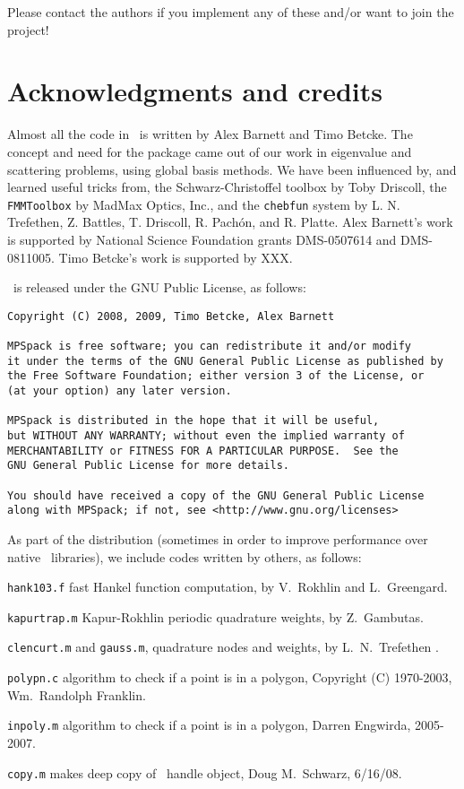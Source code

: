\documentclass[12pt]{article}
\begin{document}
Please contact the authors if you implement any of these and/or want
to join the project!



\section{Acknowledgments and credits}

Almost all the code in \mpspack\ is written by 
Alex Barnett and Timo Betcke.
The concept and need for the package came out of our work in eigenvalue
and scattering problems, using global basis methods.
We have been influenced by, and learned useful tricks from,
the Schwarz-Christoffel toolbox by Toby Driscoll,
the {\tt FMMToolbox} by MadMax Optics, Inc.,
and the {\tt chebfun} system
by L. N. Trefethen, Z. Battles, T. Driscoll, R. Pach\'{o}n, and R. Platte.
Alex Barnett's work is supported by National Science Foundation
grants DMS-0507614 and DMS-0811005.
Timo Betcke's work is supported by XXX.

\mpspack\ is released under the GNU Public License, as follows:
\begin{verbatim}
Copyright (C) 2008, 2009, Timo Betcke, Alex Barnett

MPSpack is free software; you can redistribute it and/or modify
it under the terms of the GNU General Public License as published by
the Free Software Foundation; either version 3 of the License, or
(at your option) any later version.

MPSpack is distributed in the hope that it will be useful,
but WITHOUT ANY WARRANTY; without even the implied warranty of
MERCHANTABILITY or FITNESS FOR A PARTICULAR PURPOSE.  See the
GNU General Public License for more details.

You should have received a copy of the GNU General Public License
along with MPSpack; if not, see <http://www.gnu.org/licenses>
\end{verbatim}

As part of the distribution (sometimes in order to
improve performance over native \matlab\ libraries),
we include codes written by others, as follows:
\bi
\item {\tt hank103.f} fast Hankel function computation, by
V.~Rokhlin and L.~Greengard.
\item {\tt kapurtrap.m} Kapur-Rokhlin periodic quadrature weights,
by Z.~Gambutas.
\item {\tt clencurt.m} and {\tt gauss.m}, quadrature nodes and weights,
by L.~N.~Trefethen \cite{tref}.
\item {\tt polypn.c} algorithm to check if a point is in a polygon,
Copyright (C) 1970-2003, Wm.~Randolph Franklin.
\item {\tt inpoly.m} algorithm to check if a point is in a polygon,
Darren Engwirda, 2005-2007.
\item {\tt copy.m} makes deep copy of \matlab\ handle object,
Doug M.~Schwarz, 6/16/08.
\ei


 

\end{document}
